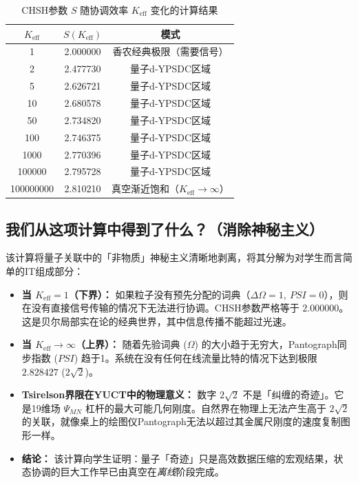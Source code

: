 \documentclass[12pt,a4paper]{article}
\begin{document}
	\begin{table}[htbp]
		\centering
		\small
		\setlength{\tabcolsep}{4pt}
		\caption{CHSH参数 \(S\) 随协调效率 \(K_{\mathrm{eff}}\) 变化的计算结果}
		\label{tab:bell_yuct}
		\begin{tabular}{ccc}
			\toprule
			\(K_{\mathrm{eff}}\) & \(S(K_{\mathrm{eff}})\) & 模式 \\
			\midrule
			1            & 2.000000 & 香农经典极限（需要信号） \\
			2            & 2.477730 & 量子d‑YPSDC区域 \\
			5            & 2.626721 & 量子d‑YPSDC区域 \\
			10           & 2.680578 & 量子d‑YPSDC区域 \\
			50           & 2.734820 & 量子d‑YPSDC区域 \\
			100          & 2.746375 & 量子d‑YPSDC区域 \\
			1000         & 2.770396 & 量子d‑YPSDC区域 \\
			100000       & 2.795728 & 量子d‑YPSDC区域 \\
			100000000    & 2.810210 & 真空渐近饱和（\(K_{\mathrm{eff}} \to \infty\)） \\
			\bottomrule
		\end{tabular}
	\end{table}
	
	\subsection{我们从这项计算中得到了什么？（消除神秘主义）}
	
	该计算将量子关联中的「非物质」神秘主义清晰地剥离，将其分解为对学生而言简单的IT组成部分：
	
	\begin{itemize}
		\item \textbf{当 \(K_{\mathrm{eff}} = 1\)（下界）：}  
		如果粒子没有预先分配的词典（\(\Delta\Omega = 1,\ PSI = 0\)），则在没有直接信号传输的情况下无法进行协调。CHSH参数严格等于 \(2.000000\)。这是贝尔局部实在论的经典世界，其中信息传播不能超过光速。
		
		\item \textbf{当 \(K_{\mathrm{eff}} \to \infty\)（上界）：}  
		随着先验词典 (\(\Omega\)) 的大小趋于无穷大，Pantograph同步指数 (\(PSI\)) 趋于1。系统在没有任何在线流量比特的情况下达到极限 \(2.828427\) (\(2\sqrt{2}\))。
		
		\item \textbf{Tsirelson界限在YUCT中的物理意义：}  
		数字 \(2\sqrt{2}\) 不是「纠缠的奇迹」。它是19维场 \(\Psi_{MN}\) 杠杆的最大可能几何刚度。自然界在物理上无法产生高于 \(2\sqrt{2}\) 的关联，就像桌上的绘图仪Pantograph无法以超过其金属尺刚度的速度复制图形一样。
		
		\item \textbf{结论：}  
		该计算向学生证明：量子「奇迹」只是高效数据压缩的宏观结果，状态协调的巨大工作早已由真空在\textit{离线}阶段完成。
	\end{itemize}
	
\end{document}
